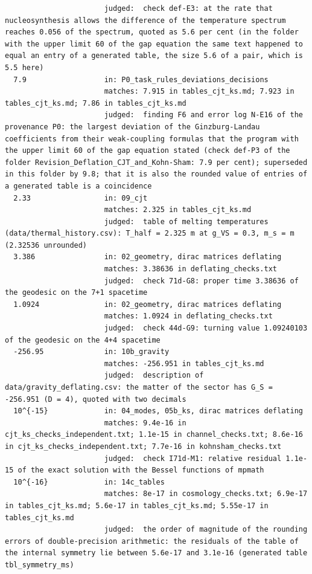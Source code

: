 \documentclass[
  10pt,
]{article}
\begin{document}
\begin{verbatim}
                       judged:  check def-E3: at the rate that nucleosynthesis allows the difference of the temperature spectrum reaches 0.056 of the spectrum, quoted as 5.6 per cent (in the folder with the upper limit 60 of the gap equation the same text happened to equal an entry of a generated table, the size 5.6 of a pair, which is 5.5 here)
  7.9                  in: P0_task_rules_deviations_decisions
                       matches: 7.915 in tables_cjt_ks.md; 7.923 in tables_cjt_ks.md; 7.86 in tables_cjt_ks.md
                       judged:  finding F6 and error log N-E16 of the provenance P0: the largest deviation of the Ginzburg-Landau coefficients from their weak-coupling formulas that the program with the upper limit 60 of the gap equation stated (check def-P3 of the folder Revision_Deflation_CJT_and_Kohn-Sham: 7.9 per cent); superseded in this folder by 9.8; that it is also the rounded value of entries of a generated table is a coincidence
  2.33                 in: 09_cjt
                       matches: 2.325 in tables_cjt_ks.md
                       judged:  table of melting temperatures (data/thermal_history.csv): T_half = 2.325 m at g_VS = 0.3, m_s = m (2.32536 unrounded)
  3.386                in: 02_geometry, dirac matrices deflating
                       matches: 3.38636 in deflating_checks.txt
                       judged:  check 71d-G8: proper time 3.38636 of the geodesic on the 7+1 spacetime
  1.0924               in: 02_geometry, dirac matrices deflating
                       matches: 1.0924 in deflating_checks.txt
                       judged:  check 44d-G9: turning value 1.09240103 of the geodesic on the 4+4 spacetime
  -256.95              in: 10b_gravity
                       matches: -256.951 in tables_cjt_ks.md
                       judged:  description of data/gravity_deflating.csv: the matter of the sector has G_S = -256.951 (D = 4), quoted with two decimals
  10^{-15}             in: 04_modes, 05b_ks, dirac matrices deflating
                       matches: 9.4e-16 in cjt_ks_checks_independent.txt; 1.1e-15 in channel_checks.txt; 8.6e-16 in cjt_ks_checks_independent.txt; 7.7e-16 in kohnsham_checks.txt
                       judged:  check I71d-M1: relative residual 1.1e-15 of the exact solution with the Bessel functions of mpmath
  10^{-16}             in: 14c_tables
                       matches: 8e-17 in cosmology_checks.txt; 6.9e-17 in tables_cjt_ks.md; 5.6e-17 in tables_cjt_ks.md; 5.55e-17 in tables_cjt_ks.md
                       judged:  the order of magnitude of the rounding errors of double-precision arithmetic: the residuals of the table of the internal symmetry lie between 5.6e-17 and 3.1e-16 (generated table tbl_symmetry_ms)

\end{verbatim}
\end{document}
